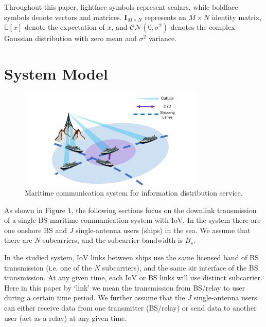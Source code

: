\documentclass{ieeeaccess}
\begin{document}
Throughout this paper, lightface symbols represent scalars, while boldface symbols denote vectors and matrices. ${\mathbf{I}}_{M \times N}$ represents an ${M \times N}$ identity matrix, $\mathbb{E}[x]$ denote the expectation of $x$, and $\mathcal{CN}(0, {\sigma}^2)$ denotes the complex Gaussian distribution with zero mean and ${\sigma}^2$ variance. 



\section{System Model}



\begin{figure} [htb]
\includegraphics*[width=8.8cm]{SysModel.png}
\caption{Maritime communication system for information distribution service.}\label{fig:1}
\end{figure}



As shown in Figure 1, the following sections focus on the downlink transmission of a single-BS maritime communication system with IoV. In the system there are one onshore BS
and  $J$ single-antenna users (ships) in the sea. We assume that there are $N$ subcarriers, and the subcarrier bandwidth is ${B_s}$. 

In the studied system, IoV links between ships use the same licensed band of BS transmission (i.e. one of the $N$ subcarriers), and the same air interface of the BS transmission. 
At any given time, each IoV or BS links will use distinct subcarrier. Here in this paper by `link' we mean the transmission from BS/relay to user during a certain time period. We further assume that the $J$ single-antenna users can either receive data from one transmitter (BS/relay) or send data to another user (act as a relay) at any given time.
\end{document}
